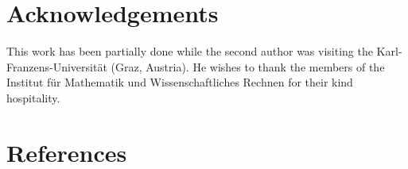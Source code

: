 \documentclass[10pt]{article}
\begin{document}
\section*{Acknowledgements}
This work has been partially done while the second author was visiting the
		Karl-Franzens-Universit\"at (Graz, Austria).
		He wishes to thank the members of the Institut f\"ur Mathematik und Wissenschaftliches Rechnen for their kind hospitality.



\section*{References}
\end{document}
